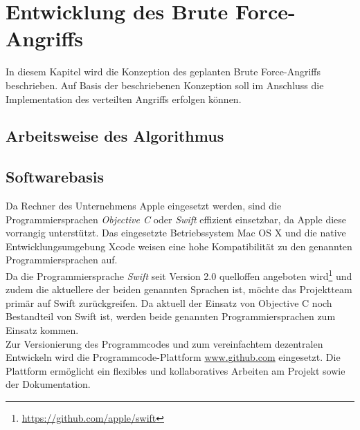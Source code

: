 \chapter{Entwicklung des Brute Force-Angriffs}
\label{ideeBruteForce}
In diesem Kapitel wird die Konzeption des geplanten Brute Force-Angriffs beschrieben. Auf Basis der beschriebenen Konzeption soll im Anschluss die Implementation des verteilten Angriffs erfolgen können. 

\section{Arbeitsweise des Algorithmus}

\section{Softwarebasis}
Da Rechner des Unternehmens Apple eingesetzt werden, sind die Programmiersprachen \emph{Objective C} oder \emph{Swift} effizient einsetzbar, da Apple diese vorrangig unterstützt. Das eingesetzte Betriebssystem Mac OS X %
und die native Entwicklungsumgebung Xcode%
weisen eine hohe Kompatibilität zu den genannten Programmiersprachen auf. \\
Da die Programmiersprache \emph{Swift} seit Version 2.0 quelloffen angeboten wird\footnote{\url{https://github.com/apple/swift}} und zudem die aktuellere der beiden genannten Sprachen ist, möchte das Projektteam primär auf Swift zurückgreifen. Da aktuell der Einsatz von Objective C noch Bestandteil von Swift ist, werden beide genannten Programmiersprachen zum Einsatz kommen. \\

Zur Versionierung des Programmcodes und zum vereinfachtem dezentralen Entwickeln wird die Programmcode-Plattform \url{www.github.com} eingesetzt. Die Plattform ermöglicht ein flexibles und kollaboratives Arbeiten am Projekt sowie der Dokumentation. \\

